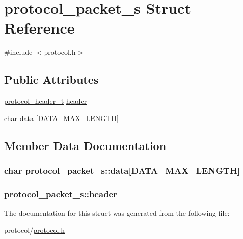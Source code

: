 \hypertarget{structprotocol__packet__s}{\section{protocol\-\_\-packet\-\_\-s Struct Reference}
\label{structprotocol__packet__s}
}


{\ttfamily \#include $<$protocol.\-h$>$}

\subsection*{Public Attributes}
\begin{DoxyCompactItemize}
\item 
\hyperlink{protocol_8h_a814cc009338b6a912057b87256b5c799}{protocol\-\_\-header\-\_\-t} \hyperlink{structprotocol__packet__s_a1cfd3d3358cecd2d883bdda81cccdaed}{header}
\item 
char \hyperlink{structprotocol__packet__s_a532c699aed76b3ce884be2c4de445965}{data} \mbox{[}\hyperlink{protocol_8h_a8c73d698b94b0897bba85eee3456cc84}{D\-A\-T\-A\-\_\-\-M\-A\-X\-\_\-\-L\-E\-N\-G\-T\-H}\mbox{]}
\end{DoxyCompactItemize}


\subsection{Member Data Documentation}
\hypertarget{structprotocol__packet__s_a532c699aed76b3ce884be2c4de445965}{
\subsubsection[{data}]{\setlength{\rightskip}{0pt plus 5cm}char protocol\-\_\-packet\-\_\-s\-::data\mbox{[}{\bf D\-A\-T\-A\-\_\-\-M\-A\-X\-\_\-\-L\-E\-N\-G\-T\-H}\mbox{]}}}\label{structprotocol__packet__s_a532c699aed76b3ce884be2c4de445965}
\hypertarget{structprotocol__packet__s_a1cfd3d3358cecd2d883bdda81cccdaed}{
\subsubsection[{header}]{ protocol\-\_\-packet\-\_\-s\-::header}}\label{structprotocol__packet__s_a1cfd3d3358cecd2d883bdda81cccdaed}


The documentation for this struct was generated from the following file\-:\begin{DoxyCompactItemize}
\item 
protocol/\hyperlink{protocol_8h}{protocol.\-h}\end{DoxyCompactItemize}
